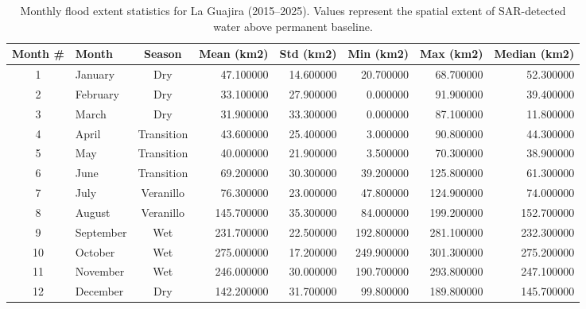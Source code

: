 \begin{table}[htbp]
\caption{Monthly flood extent statistics for La Guajira (2015--2025). Values represent the spatial extent of SAR-detected water above permanent baseline.}
\label{tab:seasonal_dynamics}
\begin{tabular}{clcrrrrr}
\toprule
Month \# & Month & Season & Mean (km2) & Std (km2) & Min (km2) & Max (km2) & Median (km2) \\
\midrule
1 & January & Dry & 47.100000 & 14.600000 & 20.700000 & 68.700000 & 52.300000 \\
2 & February & Dry & 33.100000 & 27.900000 & 0.000000 & 91.900000 & 39.400000 \\
3 & March & Dry & 31.900000 & 33.300000 & 0.000000 & 87.100000 & 11.800000 \\
4 & April & Transition & 43.600000 & 25.400000 & 3.000000 & 90.800000 & 44.300000 \\
5 & May & Transition & 40.000000 & 21.900000 & 3.500000 & 70.300000 & 38.900000 \\
6 & June & Transition & 69.200000 & 30.300000 & 39.200000 & 125.800000 & 61.300000 \\
7 & July & Veranillo & 76.300000 & 23.000000 & 47.800000 & 124.900000 & 74.000000 \\
8 & August & Veranillo & 145.700000 & 35.300000 & 84.000000 & 199.200000 & 152.700000 \\
9 & September & Wet & 231.700000 & 22.500000 & 192.800000 & 281.100000 & 232.300000 \\
10 & October & Wet & 275.000000 & 17.200000 & 249.900000 & 301.300000 & 275.200000 \\
11 & November & Wet & 246.000000 & 30.000000 & 190.700000 & 293.800000 & 247.100000 \\
12 & December & Dry & 142.200000 & 31.700000 & 99.800000 & 189.800000 & 145.700000 \\
\bottomrule
\end{tabular}
\end{table}
